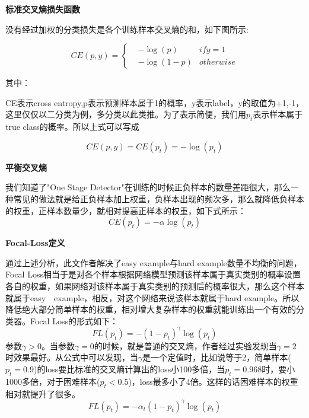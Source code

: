 \textbf{标准交叉熵损失函数}

没有经过加权的分类损失是各个训练样本交叉熵的和，如下图所示:

\begin{equation}
CE(p,y)=\left\{
\begin{aligned}
& -\log (p) 	&if y = 1\\
& -\log (1-p) 	&otherwise
\end{aligned}
\right.
\end{equation}

其中：

CE表示cross entropy,p表示预测样本属于1的概率，y表示label，y的取值为{+1,-1}，这里仅仅以二分类为例，多分类以此类推。为了表示简便，我们用$p_t$表示样本属于true class的概率。所以上式可以写成

\begin{equation}
	CE(p,y) = CE(p_t) = -\log (p_t)	
\end{equation}
	
\textbf{平衡交叉熵}

我们知道了"One Stage Detector"在训练的时候正负样本的数量差距很大，那么一种常见的做法就是给正负样本加上权重，负样本出现的频次多，那么就降低负样本的权重，正样本数量少，就相对提高正样本的权重，如下式所示：
\begin{equation}
	CE(p_t) = -\alpha \log (p_t)
\end{equation}
	
\textbf{Focal-Loss定义}

通过上述分析，此文作者解决了easy example与hard example数量不均衡的问题，Focal Loss相当于是对各个样本根据网络模型预测该样本属于真实类别的概率设置各自的权重，如果网络对该样本属于真实类别的预测后的概率很大，那么这个样本就属于easy　example，相反，对这个网络来说该样本就属于hard example。所以降低绝大部分简单样本的权重，相对增大复杂样本的权重就能训练出一个有效的分类器。Focal Loss的形式如下： 
\begin{equation}
	FL(p_t) = -(1 - p_t)^\gamma \log (p_t)
\end{equation}
参数$\gamma　> 0$。当参数$\gamma = 0$的时候，就是普通的交叉熵，作者经过实验发现当$\gamma = 2$时效果最好。从公式中可以发现，当$\gamma
$是一个定值时，比如说等于2，简单样本($p_t = 0.9$)的loss要比标准的交叉熵计算出的loss小100多倍，当$p_t=0.968$时，要小1000多倍，对于困难样本($p_t < 0.5$)，loss最多小了4倍。这样的话困难样本的权重相对就提升了很多。 
\begin{equation}
	FL(p_t) = -\alpha _t(1 - p_t)^\gamma \log (p_t)
\end{equation}
